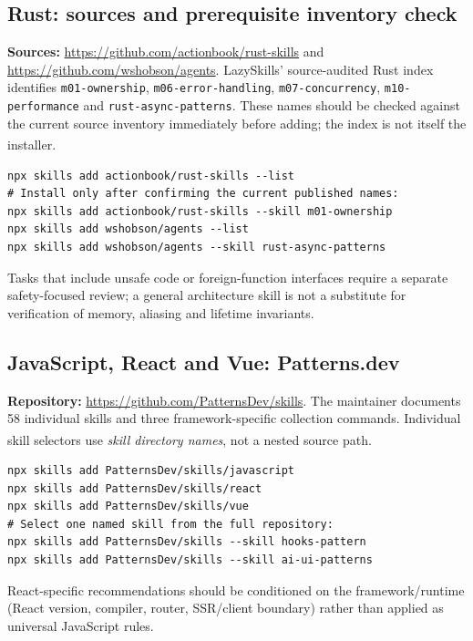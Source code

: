 \documentclass[11pt,letterpaper]{article}
\newcommand{\src}[1]{\textsuperscript{\textcolor{teal}{\cite{#1}}}}
\begin{document}
\subsection{Rust: sources and prerequisite inventory check}
\textbf{Sources:} \url{https://github.com/actionbook/rust-skills} and \url{https://github.com/wshobson/agents}. LazySkills' source-audited Rust index identifies \texttt{m01-ownership}, \texttt{m06-error-handling}, \texttt{m07-concurrency}, \texttt{m10-performance} and \texttt{rust-async-patterns}. These names should be checked against the current source inventory immediately before adding; the index is not itself the installer.\src{rustindex,rustrepo}
\begin{verbatim}
npx skills add actionbook/rust-skills --list
# Install only after confirming the current published names:
npx skills add actionbook/rust-skills --skill m01-ownership
npx skills add wshobson/agents --list
npx skills add wshobson/agents --skill rust-async-patterns
\end{verbatim}
Tasks that include unsafe code or foreign-function interfaces require a separate safety-focused review; a general architecture skill is not a substitute for verification of memory, aliasing and lifetime invariants.

\subsection{JavaScript, React and Vue: Patterns.dev}
\textbf{Repository:} \url{https://github.com/PatternsDev/skills}. The maintainer documents 58 individual skills and three framework-specific collection commands. Individual skill selectors use \emph{skill directory names}, not a nested source path.\src{patternsrepo,patternsweb}
\begin{verbatim}
npx skills add PatternsDev/skills/javascript
npx skills add PatternsDev/skills/react
npx skills add PatternsDev/skills/vue
# Select one named skill from the full repository:
npx skills add PatternsDev/skills --skill hooks-pattern
npx skills add PatternsDev/skills --skill ai-ui-patterns
\end{verbatim}
React-specific recommendations should be conditioned on the framework/runtime (React version, compiler, router, SSR/client boundary) rather than applied as universal JavaScript rules.
\end{document}
